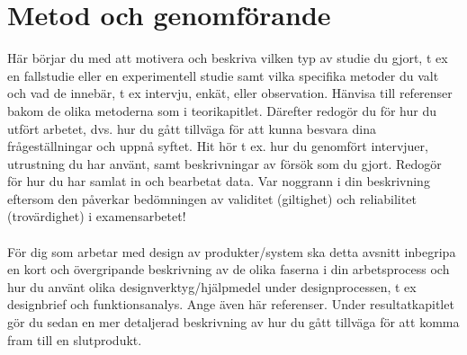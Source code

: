 \section{Metod och genomförande}
Här börjar du med att motivera och beskriva vilken typ av studie  du gjort, t ex en fallstudie eller en experimentell studie samt vilka specifika metoder du valt och vad de innebär, t ex intervju, enkät, eller observation. Hänvisa till referenser bakom de olika metoderna som i teorikapitlet. Därefter redogör du för hur du utfört arbetet, dvs. hur du gått tillväga för att kunna besvara dina frågeställningar och uppnå syftet. Hit hör t ex. hur du genomfört intervjuer, utrustning du har använt, samt beskrivningar av försök som du gjort. Redogör för hur du har samlat in och bearbetat data. Var noggrann i din beskrivning eftersom den påverkar bedömningen av validitet  (giltighet) och reliabilitet (trovärdighet) i examensarbetet!\\ \\
För dig som arbetar med design av produkter/system ska detta avsnitt inbegripa en kort och övergripande beskrivning av de olika faserna i din arbetsprocess och hur du använt olika designverktyg/hjälpmedel under designprocessen, t ex designbrief och funktionsanalys. Ange även här referenser. Under resultatkapitlet gör du sedan en mer detaljerad beskrivning av hur du gått tillväga för att komma fram till en slutprodukt.